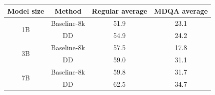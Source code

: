 \centering
    \resizebox{0.99\linewidth}{!}
    {
    \begin{tabular}{cc|cc}
    \toprule[1.5pt]
        {\bf Model size} & {\bf Method} & {\bf Regular average} & {\bf MDQA average}\\
        \toprule[1pt]
        \multirow{2}{*}{1B} & Baseline-8k& 51.9&23.1 \\
        & DD & 54.9&24.2 \\
        \midrule
        \multirow{2}{*}{3B} & Baseline-8k& 57.5&17.8 \\
        & DD & 59.0&31.1 \\
        \midrule
        \multirow{2}{*}{7B} & Baseline-8k& 59.8&31.7 \\
        & DD & 62.5&34.7 \\
    
        \bottomrule[1pt]
    \end{tabular}
    }